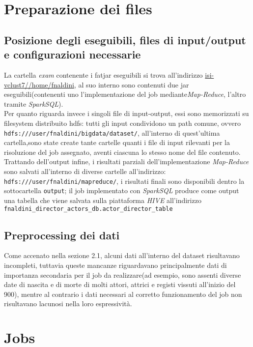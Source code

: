 \documentclass[hidelinks]{article}
\begin{document}
\section{Preparazione dei files}

\subsection{Posizione degli eseguibili, files di input/output e configurazioni necessarie}
La cartella \textit{exam} contenente i fatjar eseguibili si trova all'indirizzo \url{isi-vclust7//home/fnaldini}, al suo interno sono contenuti due jar eseguibili(contenenti uno l'implementazione del job mediante\textit{Map-Reduce}, l'altro tramite \textit{SparkSQL}).\\
Per quanto riguarda invece i singoli file di input-output, essi sono memorizzati su filesystem distribuito hdfs: tutti gli input condividono un path comune, ovvero \texttt{hdfs:///user/fnaldini/bigdata/dataset/}, all'interno di quest'ultima cartella,sono state create tante cartelle quanti i file di input rilevanti per la risoluzione del job assegnato, aventi ciascuna lo stesso nome del file contenuto.\\
Trattando dell'output infine, i risultati parziali dell'implementazione \textit{Map-Reduce}  sono salvati all'interno di diverse cartelle all'indirizzo: \texttt{hdfs:///user/fnaldini/mapreduce/}, i risultati finali sono disponibili dentro la sottocartella \texttt{output}; il job implementato con \textit{SparkSQL} produce come output una tabella che viene salvata sulla piattaforma \textit{HIVE} all'indirizzo\\ \texttt{fnaldini\_director\_actors\_db.actor\_director\_table}

\subsection{Preprocessing dei dati}
Come accenato nella sezione 2.1, alcuni dati all'interno del dataset risultavano incompleti, tuttavia queste mancanze riguardavano principalmente dati di importanza secondaria per il job da realizzare(ad esempio, sono assenti diverse date di nascita e di morte di molti attori, attrici e registi vissuti all'inizio del 900), mentre al contrario i dati necessari al corretto funzionamento del job non risultavano lacunosi nella loro espressività.



\section{Jobs}
\end{document}
